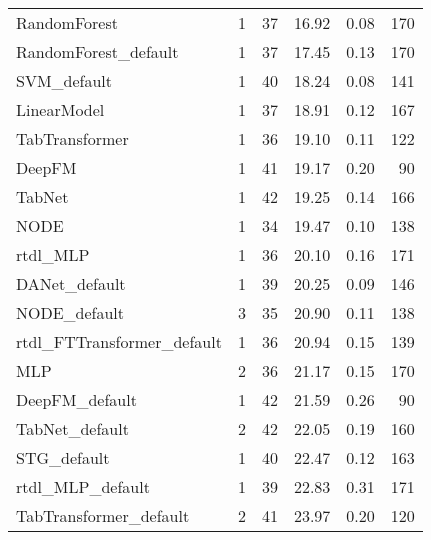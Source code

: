\begin{tabular}{lrrrrr}
RandomForest               &                  1 &  37 &  16.92 &                           0.08 &   170 \\
RandomForest_default       &                  1 &  37 &  17.45 &                           0.13 &   170 \\
SVM_default                &                  1 &  40 &  18.24 &                           0.08 &   141 \\
LinearModel                &                  1 &  37 &  18.91 &                           0.12 &   167 \\
TabTransformer             &                  1 &  36 &  19.10 &                           0.11 &   122 \\
DeepFM                     &                  1 &  41 &  19.17 &                           0.20 &    90 \\
TabNet                     &                  1 &  42 &  19.25 &                           0.14 &   166 \\
NODE                       &                  1 &  34 &  19.47 &                           0.10 &   138 \\
rtdl_MLP                   &                  1 &  36 &  20.10 &                           0.16 &   171 \\
DANet_default              &                  1 &  39 &  20.25 &                           0.09 &   146 \\
NODE_default               &                  3 &  35 &  20.90 &                           0.11 &   138 \\
rtdl_FTTransformer_default &                  1 &  36 &  20.94 &                           0.15 &   139 \\
MLP                        &                  2 &  36 &  21.17 &                           0.15 &   170 \\
DeepFM_default             &                  1 &  42 &  21.59 &                           0.26 &    90 \\
TabNet_default             &                  2 &  42 &  22.05 &                           0.19 &   160 \\
STG_default                &                  1 &  40 &  22.47 &                           0.12 &   163 \\
rtdl_MLP_default           &                  1 &  39 &  22.83 &                           0.31 &   171 \\
TabTransformer_default     &                  2 &  41 &  23.97 &                           0.20 &   120 \\

\end{tabular}
